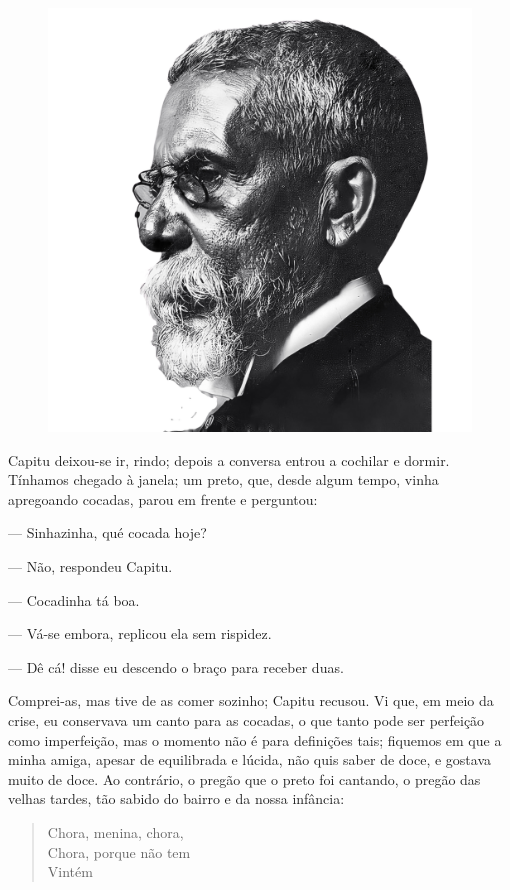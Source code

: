 \begin{myquote}

\begin{figure}[H]
\centering
\includegraphics[scale=0.25]{./imgSAEB_7_POR/media/image57.png}
\end{figure}

Capitu deixou-se ir, rindo; depois a conversa entrou a cochilar e
dormir. Tínhamos chegado à janela; um preto, que, desde algum
tempo, vinha apregoando cocadas, parou em frente e perguntou:

--- Sinhazinha, qué cocada hoje?

--- Não, respondeu Capitu.

--- Cocadinha tá boa.

--- Vá-se embora, replicou ela sem rispidez.

--- Dê cá! disse eu descendo o braço para receber duas.

Comprei-as, mas tive de as comer sozinho; Capitu recusou. Vi
que, em meio da crise, eu conservava um canto para as cocadas, o
que tanto pode ser perfeição como imperfeição, mas o momento
não é para definições tais; fiquemos em que a minha amiga,
apesar de equilibrada e lúcida, não quis saber de doce, e gostava
muito de doce. Ao contrário, o pregão que o preto foi cantando, o
pregão das velhas tardes, tão sabido do bairro e da nossa infância:

\begin{verse}
Chora, menina, chora, \\
Chora, porque não tem \\
Vintém
\end{verse}


\end{myquote}


